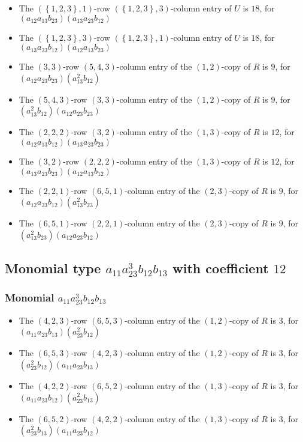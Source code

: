 \documentclass{article}
\begin{document}
\begin{itemize}
\item The $ \left(\left\{1, 2, 3\right\}, 1\right) $-row $ \left(\left\{1, 2, 3\right\}, 3\right) $-column entry of $U$ is $ 18 $, for $( a_{12} a_{13} b_{23} )( a_{13} a_{23} b_{12} )$ 
\item The $ \left(\left\{1, 2, 3\right\}, 3\right) $-row $ \left(\left\{1, 2, 3\right\}, 1\right) $-column entry of $U$ is $ 18 $, for $( a_{13} a_{23} b_{12} )( a_{12} a_{13} b_{23} )$ 
\item The $(3, 3)$-row $(5, 4, 3)$-column entry of the $ \left(1, 2\right) $-copy of $R$ is $ 9 $, for $( a_{12} a_{23} b_{23} )( a_{13}^{2} b_{12} )$ 
\item The $(5, 4, 3)$-row $(3, 3)$-column entry of the $ \left(1, 2\right) $-copy of $R$ is $ 9 $, for $( a_{13}^{2} b_{12} )( a_{12} a_{23} b_{23} )$ 
\item The $(2, 2, 2)$-row $(3, 2)$-column entry of the $ \left(1, 3\right) $-copy of $R$ is $ 12 $, for $( a_{12} a_{13} b_{12} )( a_{13} a_{23} b_{23} )$ 
\item The $(3, 2)$-row $(2, 2, 2)$-column entry of the $ \left(1, 3\right) $-copy of $R$ is $ 12 $, for $( a_{13} a_{23} b_{23} )( a_{12} a_{13} b_{12} )$ 
\item The $(2, 2, 1)$-row $(6, 5, 1)$-column entry of the $ \left(2, 3\right) $-copy of $R$ is $ 9 $, for $( a_{12} a_{23} b_{12} )( a_{13}^{2} b_{23} )$ 
\item The $(6, 5, 1)$-row $(2, 2, 1)$-column entry of the $ \left(2, 3\right) $-copy of $R$ is $ 9 $, for $( a_{13}^{2} b_{23} )( a_{12} a_{23} b_{12} )$ 
\end{itemize}
\subsection{Monomial type $ a_{11} a_{23}^{3} b_{12} b_{13} $ with coefficient $ 12 $}

\subsubsection{Monomial $ a_{11} a_{23}^{3} b_{12} b_{13} $}

\begin{itemize}
\item The $(4, 2, 3)$-row $(6, 5, 3)$-column entry of the $ \left(1, 2\right) $-copy of $R$ is $ 3 $, for $( a_{11} a_{23} b_{13} )( a_{23}^{2} b_{12} )$ 
\item The $(6, 5, 3)$-row $(4, 2, 3)$-column entry of the $ \left(1, 2\right) $-copy of $R$ is $ 3 $, for $( a_{23}^{2} b_{12} )( a_{11} a_{23} b_{13} )$ 
\item The $(4, 2, 2)$-row $(6, 5, 2)$-column entry of the $ \left(1, 3\right) $-copy of $R$ is $ 3 $, for $( a_{11} a_{23} b_{12} )( a_{23}^{2} b_{13} )$ 
\item The $(6, 5, 2)$-row $(4, 2, 2)$-column entry of the $ \left(1, 3\right) $-copy of $R$ is $ 3 $, for $( a_{23}^{2} b_{13} )( a_{11} a_{23} b_{12} )$ 
\end{itemize}
\end{document}
